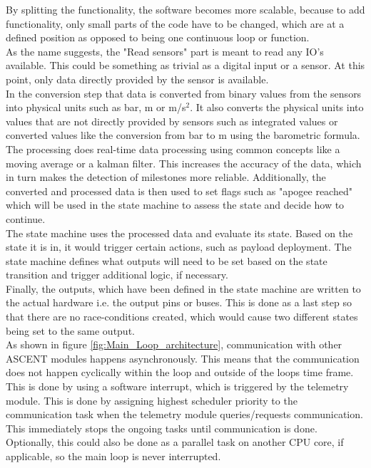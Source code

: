 \documentclass[fontsize=11pt,%
twoside,%
BCOR          = 8mm, %
DIV           = 11,  %
titlepage     = off,%
index=totoc,%
xcolor        = pdftex,%
dvipsnames,%
bibliography  = totoc,%
bibliography = numbered, %
listof        = notnumbered]{scrreprt}
\begin{document}
By splitting the functionality, the software becomes more scalable, because to add functionality, only small parts of the code have to be changed, which are at a defined position as opposed to being one continuous loop or function.\\
As the name suggests, the "Read sensors" part is meant to read any IO's available. This could be something as trivial as a digital input or a sensor. At this point, only data directly provided by the sensor is available.\\
In the conversion step that data is converted from binary values from the sensors into physical units such as bar, m or m/s$^2$. It also converts the physical units into values that are not directly provided by sensors such as integrated values or converted values like the conversion from bar to m using the barometric formula.\\
The processing does real-time data processing using common concepts like a moving average or a kalman filter. This increases the accuracy of the data, which in turn makes the detection of milestones more reliable. Additionally, the converted and processed data is then used to set flags such as "apogee reached" which will be used in the state machine to assess the state and decide how to continue.\\
The state machine uses the processed data and evaluate its state. Based on the state it is in, it would trigger certain actions, such as payload deployment. The state machine defines what outputs will need to be set based on the state transition and trigger additional logic, if necessary.\\
Finally, the outputs, which have been defined in the state machine are written to the actual hardware i.e. the output pins or buses. This is done as a last step so that there are no race-conditions created, which would cause two different states being set to the same output.\\ 
As shown in figure \ref{fig:Main_Loop_architecture}, communication with other ASCENT modules happens asynchronously. This means that the communication does not happen cyclically within the loop and outside of the loops time frame. This is done by using a software interrupt, which is triggered by the telemetry module. This is done by assigning highest scheduler priority to the communication task when the telemetry module queries/requests communication. This immediately stops the ongoing tasks until communication is done. Optionally, this could also be done as a parallel task on another CPU core, if applicable, so the main loop is never interrupted.\\
\end{document}
